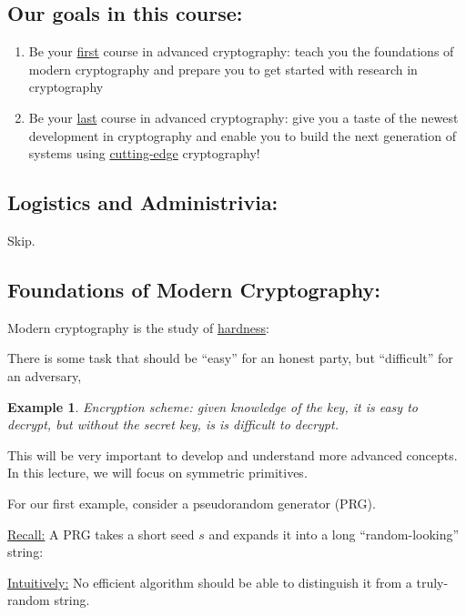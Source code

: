 \documentclass{article}
\newtheorem{example}{Example}
\begin{document}
\subsection{Our goals in this course:}
\begin{enumerate}
    \item Be your \underline{first} course in advanced cryptography: teach you the foundations of modern cryptography and prepare you to get started with research in cryptography
    \item Be your \underline{last} course in advanced cryptography: give you a taste of the newest development in cryptography and enable you to build the next generation of systems using \underline{cutting-edge} cryptography!
\end{enumerate}

\subsection{Logistics and Administrivia:}
Skip.

\subsection{Foundations of Modern Cryptography:}

Modern cryptography is the study of \underline{hardness}: 

There is some task that should be ``easy'' for an honest party, but ``difficult'' for an adversary,

\begin{example} 
Encryption scheme: given knowledge of the key, it is easy to decrypt, but without the secret key, is is difficult to decrypt.
\end{example} 


This will be very important to develop and understand more advanced concepts. 
In this lecture, we will focus on symmetric primitives.

For our first example, consider a pseudorandom generator (PRG).

\underline{Recall:} A PRG takes a short seed $s$ and expands it into a long ``random-looking'' string:



\noindent {\color{purple} {Question: What does it mean to be ``random-looking''?}}

\underline{Intuitively:} No efficient algorithm should be able to distinguish it from a truly-random string.
\end{document}
